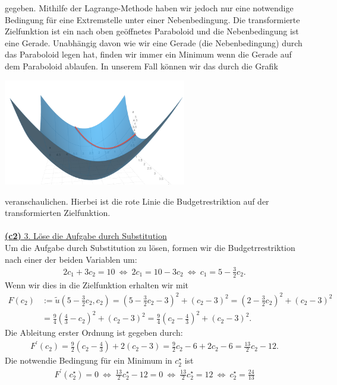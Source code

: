 gegeben. Mithilfe der Lagrange-Methode haben wir jedoch nur eine notwendige Bedingung für eine Extremstelle unter einer Nebenbedingung.
Die transformierte Zielfunktion ist ein nach oben geöffnetes Paraboloid und die Nebenbedingung ist eine Gerade.
Unabhängig davon wie wir eine Gerade (die Nebenbedingung) durch das Paraboloid legen hat, finden wir immer ein Minimum wenn die Gerade auf dem Paraboloid ablaufen.
\newpage
In unserem Fall können wir das durch die Grafik
\begin{center}
	\includegraphics[width=0.6\textwidth]{pictures/aufgabe1_c}
\end{center}
veranschaulichen.
Hierbei ist die rote Linie die Budgetrestriktion auf der transformierten Zielfunktion.\\
\\
\underline{\textbf{(c2)} 3. Löse die Aufgabe durch Substitution}\\
Um die Aufgabe durch Substitution zu lösen, formen wir die Budgetrrestriktion nach einer der beiden Variablen um:
\begin{align*}
	2 c_1 + 3 c_2 = 10
	\ \Leftrightarrow \ 
	2c_1 = 10 - 3 c_2 
	\ \Leftrightarrow \
	c_1 = 5 - \frac{3}{2} c_2.
\end{align*}
Wenn wir dies in die Zielfunktion erhalten wir mit
\begin{align*}
	F(c_2)
	&:= 
	\tilde{u}\left(5 - \frac{3}{2} c_2, c_2\right)
	= 
	\left(5 - \frac{3}{2} c_2 -3 \right)^2 + (c_2 -3 )^2
	=
	\left(2 - \frac{3}{2} c_2\right)^2 + (c_2 -3)^2\\
	&=
	\frac{9}{4} \left(\frac{4}{3} - c_2\right)^2 + (c_2 -3)^2
	=
	\frac{9}{4} \left(c_2 -\frac{4}{3} \right)^2 + (c_2 -3)^2.
\end{align*}
Die Ableitung erster Ordnung ist gegeben durch:
\begin{align*}
	F^\prime(c_2)
	=
	\frac{9}{2} \left(c_2 - \frac{4}{3}\right) + 2 (c_2 -3)
	=
	\frac{9}{2} c_2 - 6 + 2 c_2 - 6
	=
	\frac{13}{2} c_2 -12.
\end{align*}
Die notwendie Bedingung für ein Minimum in $c^\star_2$ ist
\begin{align*}
	F^\prime(c_2^\star) = 0 
	\ \Leftrightarrow \
	\frac{13}{2} c_2^\star - 12 = 0  
	\ \Leftrightarrow \
	\frac{13}{2} c_2^\star = 12 
	\ \Leftrightarrow \
	c_2^\star = \frac{24}{13}
\end{align*}
